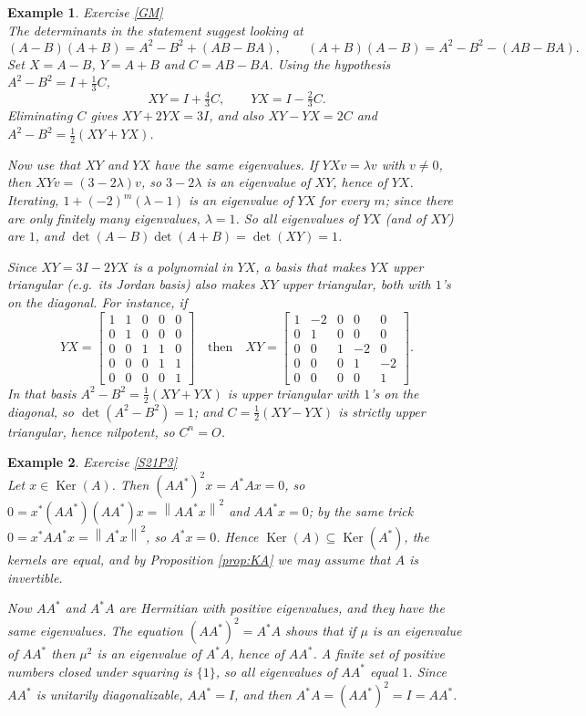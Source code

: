 \documentclass[12pt]{article}
\newcommand{\norm}[1]{\left\lVert #1 \right\rVert}
\DeclareMathOperator{\Ker}{Ker}
\theoremstyle{breakplain}
\theoremstyle{breakdef}
\newtheorem*{example}{Example}
\theoremstyle{remark}
\begin{document}
\begin{example}Exercise \ref{GM}\\
    The determinants in the statement suggest looking at
    \[(A-B)(A+B)=A^2-B^2+(AB-BA),\qquad (A+B)(A-B)=A^2-B^2-(AB-BA).\]
    Set $X=A-B$, $Y=A+B$ and $C=AB-BA$. Using the hypothesis $A^2-B^2=I+\frac13C$,
    \[XY=I+\tfrac{4}{3}C,\qquad YX=I-\tfrac{2}{3}C.\]
    Eliminating $C$ gives $XY+2YX=3I$, and also $XY-YX=2C$ and $A^2-B^2=\frac12(XY+YX)$.

    Now use that $XY$ and $YX$ have the same eigenvalues. If $YXv=\lambda v$ with $v\neq0$, then $XYv=(3-2\lambda)v$, so $3-2\lambda$ is an eigenvalue of $XY$, hence of $YX$. Iterating, $1+(-2)^m(\lambda-1)$ is an eigenvalue of $YX$ for every $m$; since there are only finitely many eigenvalues, $\lambda=1$. So all eigenvalues of $YX$ (and of $XY$) are $1$, and $\det(A-B)\det(A+B)=\det(XY)=1$.

    Since $XY=3I-2YX$ is a polynomial in $YX$, a basis that makes $YX$ upper triangular (e.g.\ its Jordan basis) also makes $XY$ upper triangular, both with $1$'s on the diagonal. For instance, if
    \[YX= \begin{bmatrix}
    1 & 1 & 0 & 0 & 0 \\
    0 & 1 & 0 & 0 & 0 \\
    0 & 0 & 1 & 1 & 0 \\
    0 & 0 & 0 & 1 & 1 \\
    0 & 0 & 0 & 0 & 1
    \end{bmatrix}\quad\text{then}\quad XY= \begin{bmatrix}
    1 & -2 & 0 & 0 & 0 \\
    0 & 1 & 0 & 0 & 0 \\
    0 & 0 & 1 & -2 & 0 \\
    0 & 0 & 0 & 1 & -2 \\
    0 & 0 & 0 & 0 & 1
    \end{bmatrix}.\]
    In that basis $A^2-B^2=\frac12(XY+YX)$ is upper triangular with $1$'s on the diagonal, so $\det(A^2-B^2)=1$; and $C=\frac12(XY-YX)$ is strictly upper triangular, hence nilpotent, so $C^n=O$.
\end{example}
\begin{example}Exercise \ref{S21P3}\\
    Let $x\in \Ker(A)$. Then $(AA^*)^2x=A^*Ax=0$, so $0=x^*(AA^*)(AA^*)x=\norm{AA^*x}^2$ and $AA^*x=0$; by the same trick $0=x^*AA^*x=\norm{A^*x}^2$, so $A^*x=0$. Hence $\Ker(A)\subseteq\Ker(A^*)$, the kernels are equal, and by Proposition \ref{prop:KA} we may assume that $A$ is invertible.

    Now $AA^*$ and $A^*A$ are Hermitian with positive eigenvalues, and they have the same eigenvalues. The equation $(AA^*)^2=A^*A$ shows that if $\mu$ is an eigenvalue of $AA^*$ then $\mu^2$ is an eigenvalue of $A^*A$, hence of $AA^*$. A finite set of positive numbers closed under squaring is $\{1\}$, so all eigenvalues of $AA^*$ equal $1$. Since $AA^*$ is unitarily diagonalizable, $AA^*=I$, and then $A^*A=(AA^*)^2=I=AA^*$.

\end{example}
\end{document}
